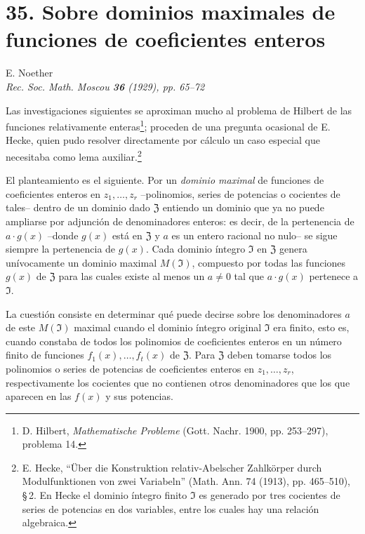 
\clearpage
\section*{35. Sobre dominios maximales de funciones de coeficientes enteros}
\begin{center}
E. Noether\\
\textit{Rec. Soc. Math. Moscou \textbf{36} (1929), pp. 65--72}
\end{center}

Las investigaciones siguientes se aproximan mucho al problema de Hilbert de las funciones relativamente enteras\footnote{D. Hilbert, \emph{Mathematische Probleme} (Gott. Nachr. 1900, pp. 253--297), problema 14.}; proceden de una pregunta ocasional de E. Hecke, quien pudo resolver directamente por cálculo un caso especial que necesitaba como lema auxiliar.\footnote{E. Hecke, ``Über die Konstruktion relativ-Abelscher Zahlkörper durch Modulfunktionen von zwei Variabeln'' (Math. Ann. 74 (1913), pp. 465--510), \S\,2. En Hecke el dominio íntegro finito $\mathfrak{I}$ es generado por tres cocientes de series de potencias en dos variables, entre los cuales hay una relación algebraica.}

El planteamiento es el siguiente. Por un \emph{dominio maximal} de funciones de coeficientes enteros en $z_1,\ldots,z_r$ --polinomios, series de potencias o cocientes de tales-- dentro de un dominio dado $\mathfrak{Z}$ entiendo un dominio que ya no puede ampliarse por adjunción de denominadores enteros: es decir, de la pertenencia de $a\cdot g(x)$ --donde $g(x)$ está en $\mathfrak{Z}$ y $a$ es un entero racional no nulo-- se sigue siempre la pertenencia de $g(x)$. Cada dominio íntegro $\mathfrak{I}$ en $\mathfrak{Z}$ genera unívocamente un dominio maximal $M(\mathfrak{I})$, compuesto por todas las funciones $g(x)$ de $\mathfrak{Z}$ para las cuales existe al menos un $a\ne0$ tal que $a\cdot g(x)$ pertenece a $\mathfrak{I}$.

La cuestión consiste en determinar qué puede decirse sobre los denominadores $a$ de este $M(\mathfrak{I})$ maximal cuando el dominio íntegro original $\mathfrak{I}$ era finito, esto es, cuando constaba de todos los polinomios de coeficientes enteros en un número finito de funciones $f_1(x),\ldots,f_t(x)$ de $\mathfrak{Z}$. Para $\mathfrak{Z}$ deben tomarse todos los polinomios o series de potencias de coeficientes enteros en $z_1,\ldots,z_r$, respectivamente los cocientes que no contienen otros denominadores que los que aparecen en las $f(x)$ y sus potencias.

